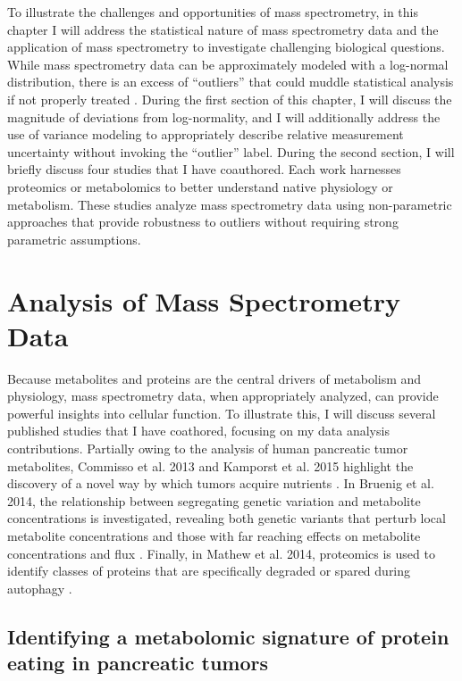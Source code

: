 To illustrate the challenges and opportunities of mass spectrometry, in this chapter I will address the statistical nature of mass spectrometry data and the application of mass spectrometry to investigate challenging biological questions.  While mass spectrometry data can be approximately modeled with a log-normal distribution, there is an excess of ``outliers'' that could muddle statistical analysis if not properly treated \cite{Nesvizhskii:2005jp, Cox:2008ir}. During the first section of this chapter, I will discuss the magnitude of deviations from log-normality, and I will additionally address the use of variance modeling to appropriately describe relative measurement uncertainty without invoking the ``outlier'' label.  During the second section, I will briefly discuss four studies that I have coauthored. Each work harnesses proteomics or metabolomics to better understand native physiology or metabolism. These studies analyze mass spectrometry data using non-parametric approaches that provide robustness to outliers without requiring strong parametric assumptions.




\section{Analysis of Mass Spectrometry Data}

Because metabolites and proteins are the central drivers of metabolism and physiology, mass spectrometry data, when appropriately analyzed, can provide powerful insights into cellular function.  To illustrate this, I will discuss several published studies that I have coathored, focusing on my data analysis contributions. Partially owing to the analysis of human pancreatic tumor metabolites, Commisso et al. 2013 and Kamporst et al. 2015 highlight the discovery of a novel way by which tumors acquire nutrients \cite{Commisso:2013hz, Kamphorst:2015cc}. In Bruenig et al. 2014, the relationship between segregating genetic variation and metabolite concentrations is investigated, revealing both genetic variants that perturb local metabolite concentrations and those with far reaching effects on metabolite concentrations and flux \cite{Breunig:2014bu}.  Finally, in Mathew et al. 2014, proteomics is used to identify classes of proteins that are specifically degraded or spared during autophagy \cite{Mathew:2014hz}.

\subsection{Identifying a metabolomic signature of protein eating in pancreatic tumors}

